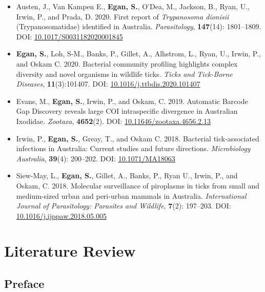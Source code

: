 \documentclass[a4paper, nobind]{templates/ociamthesis}
\renewcommand{\chaptermark}[1]{\markboth{\thechapter. #1}{\thechapter. #1}}
\begin{document}
\begin{itemize}
\item
  Austen, J., Van Kampen E., \textbf{Egan, S.}, O'Dea, M., Jackson, B., Ryan, U., Irwin, P., and Prada, D. 2020. First report of \emph{Trypanosoma dionisii} (Trypanosomatidae) identified in Australia. \emph{Parasitology}, \textbf{147}(14): 1801--1809. DOI: \href{https://doi.org/10.1017/S0031182020001845}{10.1017/S0031182020001845}
\item
  \textbf{Egan, S.}, Loh, S-M., Banks, P., Gillet, A., Alhstrom, L., Ryan, U., Irwin, P., and Oskam C. 2020. Bacterial community profiling highlights complex diversity and novel organisms in wildlife ticks. \emph{Ticks and Tick-Borne Diseases}, \textbf{11}(3):101407. DOI: \href{https://doi.org/10.1016/j.ttbdis.2020.101407}{10.1016/j.ttbdis.2020.101407}
\item
  Evans, M., \textbf{Egan, S.}, Irwin, P., and Oskam, C. 2019. Automatic Barcode Gap Discovery reveals large COI intraspecific divergence in Australian Ixodidae. \emph{Zootaxa}, \textbf{4652}(2). DOI: \href{https://doi.org/10.11646/zootaxa.4656.2.13}{10.11646/zootaxa.4656.2.13}
\item
  Irwin, P., \textbf{Egan, S.}, Greay, T., and Oskam C. 2018. Bacterial tick-associated infections in Australia: Current studies and future directions. \emph{Microbiology Australia}, \textbf{39}(4): 200--202. DOI: \href{https://doi.org/10.1071/MA18063}{10.1071/MA18063}
\item
  Siew-May, L., \textbf{Egan, S.}, Gillet, A., Banks, P., Ryan U., Irwin, P., and Oskam, C. 2018. Molecular surveillance of piroplasms in ticks from small and medium-sized urban and peri-urban mammals in Australia. \emph{International Journal of Parasitology: Parasites and Wildlife}, \textbf{7}(2): 197--203. DOI: \href{https://doi.org/10.1016/j.ijppaw.2018.05.005}{10.1016/j.ijppaw.2018.05.005}
\end{itemize}

\hypertarget{litrev}{%
\chapter{Literature Review}\label{litrev}}

\chaptermark{Review}

\minitoc 

\hypertarget{preface}{%
\section*{Preface}\label{preface}}
\end{document}
